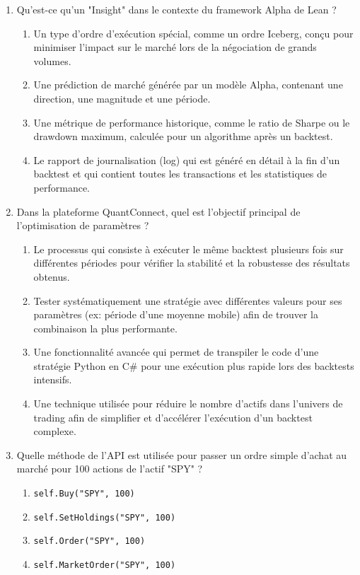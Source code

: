 \documentclass[a4paper,12pt]{article}
\begin{document}
\begin{enumerate}
    \item Qu'est-ce qu'un "Insight" dans le contexte du framework Alpha de Lean ?
    \begin{enumerate}[label=(\Alph*)]
        \item Un type d'ordre d'exécution spécial, comme un ordre Iceberg, conçu pour minimiser l'impact sur le marché lors de la négociation de grands volumes.
        \item Une prédiction de marché générée par un modèle Alpha, contenant une direction, une magnitude et une période.
        \item Une métrique de performance historique, comme le ratio de Sharpe ou le drawdown maximum, calculée pour un algorithme après un backtest.
        \item Le rapport de journalisation (log) qui est généré en détail à la fin d'un backtest et qui contient toutes les transactions et les statistiques de performance.
    \end{enumerate}

    \item Dans la plateforme QuantConnect, quel est l'objectif principal de l'optimisation de paramètres ?
    \begin{enumerate}[label=(\Alph*)]
        \item Le processus qui consiste à exécuter le même backtest plusieurs fois sur différentes périodes pour vérifier la stabilité et la robustesse des résultats obtenus.
        \item Tester systématiquement une stratégie avec différentes valeurs pour ses paramètres (ex: période d'une moyenne mobile) afin de trouver la combinaison la plus performante.
        \item Une fonctionnalité avancée qui permet de transpiler le code d'une stratégie Python en C\# pour une exécution plus rapide lors des backtests intensifs.
        \item Une technique utilisée pour réduire le nombre d'actifs dans l'univers de trading afin de simplifier et d'accélérer l'exécution d'un backtest complexe.
    \end{enumerate}
    
    \item Quelle méthode de l'API est utilisée pour passer un ordre simple d'achat au marché pour 100 actions de l'actif "SPY" ?
    \begin{enumerate}[label=(\Alph*)]
        \item \texttt{self.Buy("SPY", 100)}
        \item \texttt{self.SetHoldings("SPY", 100)}
        \item \texttt{self.Order("SPY", 100)}
        \item \texttt{self.MarketOrder("SPY", 100)}
    \end{enumerate}


\end{enumerate}
\end{document}
